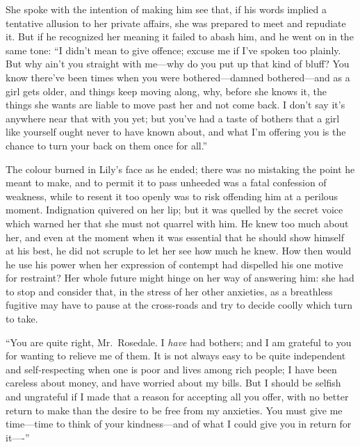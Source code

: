 \documentclass[12pt,a4paper]{book}
\begin{document}
She spoke with the intention of making him see that, if his words
implied a tentative allusion to her private affairs, she was
prepared to meet and repudiate it. But if he recognized her
meaning it failed to abash him, and he went on in the same tone: 
``I didn't mean to give offence; excuse me if I've spoken too
plainly. But why ain't you straight with me---why do you
put up that kind of bluff? You know there've been times when you
were bothered---damned bothered---and as a girl gets older, and
things keep moving along, why, before she knows it, the things
she wants are liable to move past her and not come back. I don't
say it's anywhere near that with you yet; but you've had a taste
of bothers that a girl like yourself ought never to have known
about, and what I'm offering you is the chance to turn your back
on them once for all.''





The colour burned in Lily's face as he ended; there was no
mistaking the point he meant to make, and to permit it to pass
unheeded was a fatal confession of weakness, while to resent it
too openly was to risk offending him at a perilous moment. 
Indignation quivered on her lip; but it was quelled by the secret
voice which warned her that she must not quarrel with him. He
knew too much about her, and even at the moment when it was
essential that he should show himself at his best, he did not
scruple to let her see how much he knew. How then would he use
his power when her expression of contempt had dispelled his one
motive for restraint? Her whole future might hinge on her way
of answering him: she had to stop and consider that, in the
stress of her other anxieties, as a breathless fugitive may have
to pause at the cross-roads and try to decide coolly which turn
to take.





``You are quite right, Mr.\ Rosedale. I \textit{have} had bothers; and
I am grateful to you for wanting to relieve me of them. It is
not always easy to be quite independent and self-respecting
when one is poor and lives among rich people; I have been
careless about money, and have worried about my bills. But I
should be selfish and ungrateful if I made that a reason for
accepting all you offer, with no better return to make than
the desire to be free from my anxieties. You must give me
time---time to think of your kindness---and of what I could
give you in return for it----''
\end{document}

